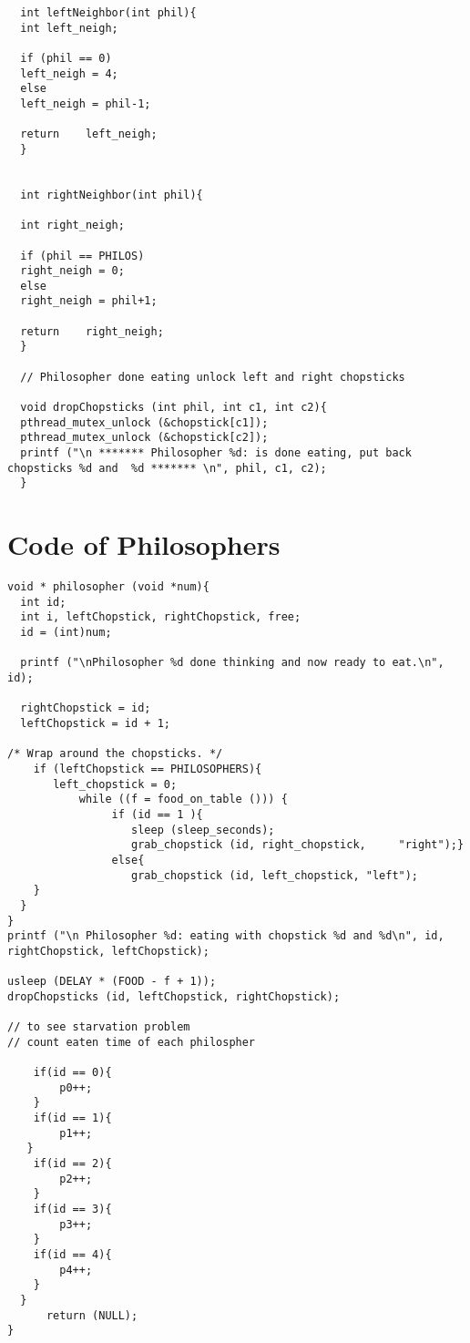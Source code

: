 \documentclass{report}
\numberwithin{figure}{section}
\begin{document}
\begin{lstlisting}
  int leftNeighbor(int phil){
  int left_neigh;
  
  if (phil == 0)
  left_neigh = 4;
  else
  left_neigh = phil-1;
  
  return 	left_neigh;
  }
  
  
  int rightNeighbor(int phil){
  
  int right_neigh;
  
  if (phil == PHILOS)
  right_neigh = 0;
  else
  right_neigh = phil+1;
  
  return 	right_neigh;
  }
  
  // Philosopher done eating unlock left and right chopsticks
  
  void dropChopsticks (int phil, int c1, int c2){
  pthread_mutex_unlock (&chopstick[c1]);
  pthread_mutex_unlock (&chopstick[c2]);
  printf ("\n ******* Philosopher %d: is done eating, put back chopsticks %d and  %d ******* \n", phil, c1, c2);
  }
\end{lstlisting}
\newpage
\section*{Code of Philosophers}

\begin{lstlisting}
void * philosopher (void *num){
  int id;
  int i, leftChopstick, rightChopstick, free;
  id = (int)num;
  
  printf ("\nPhilosopher %d done thinking and now ready to eat.\n", id);

  rightChopstick = id;
  leftChopstick = id + 1;

/* Wrap around the chopsticks. */
    if (leftChopstick == PHILOSOPHERS){
       left_chopstick = 0;
           while ((f = food_on_table ())) {
                if (id == 1 ){
                   sleep (sleep_seconds);
                   grab_chopstick (id, right_chopstick, 	"right");}
                else{
                   grab_chopstick (id, left_chopstick, "left");
    }
  }
}
printf ("\n Philosopher %d: eating with chopstick %d and %d\n", id, rightChopstick, leftChopstick);

usleep (DELAY * (FOOD - f + 1));
dropChopsticks (id, leftChopstick, rightChopstick);

// to see starvation problem
// count eaten time of each philospher

    if(id == 0){
        p0++;
    }
    if(id == 1){
        p1++;
   }
    if(id == 2){
        p2++;
    }
    if(id == 3){
        p3++;
    }
    if(id == 4){
        p4++;
    }
  }
      return (NULL);
}
\end{lstlisting}
\end{document}
